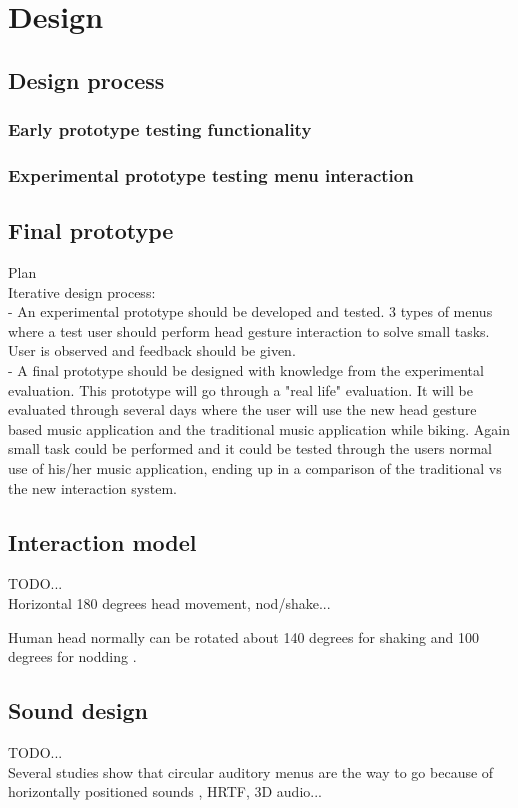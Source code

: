\chapter{Design}

\section{Design process}

\subsection{Early prototype testing functionality}

\subsection{Experimental prototype testing menu interaction}


\section{Final prototype}


Plan\\
Iterative design process:\\
- An experimental prototype should be developed and tested. 3 types of menus where a test user should perform head gesture interaction to solve small tasks. User is observed and feedback should be given.\\
- A final prototype should be designed with knowledge from the experimental evaluation. This prototype will go through a "real life" evaluation. It will be evaluated through several days where the user will use the new head gesture based music application and the traditional music application while biking. Again small task could be performed and it could be tested through the users normal use of his/her music application, ending up in a comparison of the traditional vs the new interaction system.

\section{Interaction model}
TODO...\\
Horizontal 180 degrees head movement, nod/shake...

Human head normally can be rotated about 140 degrees for shaking and 100 degrees for nodding \cite{lopresti_neck_2000}.



\section{Sound design}
TODO...\\
Several studies show that circular auditory menus are the way to go because of horizontally positioned sounds , HRTF, 3D audio...



